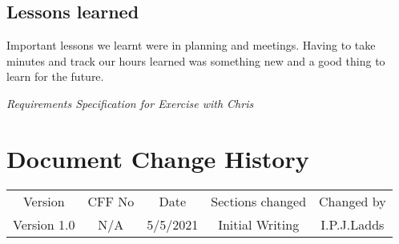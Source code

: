 \documentclass[10pt,a4paper]{article}
\begin{document}
	\subsection{Lessons learned}
	Important lessons we learnt were in planning and meetings. Having to take minutes and track our hours learned was something new and a good thing to learn for the future. 
	\begin{thebibliography}{widestlabel}
		\textit{Requirements Specification for Exercise with Chris}
	\end{thebibliography}
	\section{Document Change History}
	\begin{center}
		\begin{tabular}{ c c c c c}
			Version & CFF No & Date & Sections changed & Changed by \\
			Version 1.0 & N/A &  5/5/2021 & Initial Writing & I.P.J.Ladds
		\end{tabular}

	\end{center}
\end{document}
